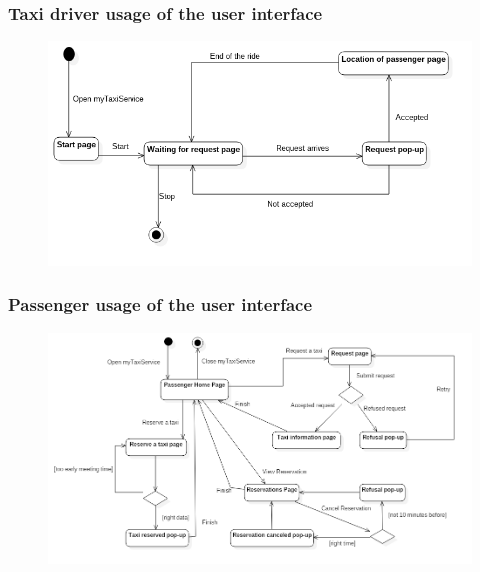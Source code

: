 \subsubsection{Taxi driver usage of the user interface}
\begin{figure}[H]
\centering
\includegraphics[scale=0.45]{Images/statechart_GUI}
\end{figure}

\subsubsection{Passenger usage of the user interface}
\begin{figure}[H]
\centering
\includegraphics[scale=0.5]{Images/statechart_GUI_Passenger}
\end{figure}